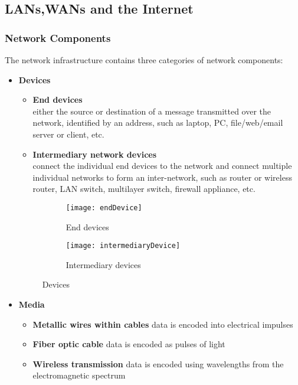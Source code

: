 \documentclass[crop=false]{standalone}
\begin{document}
\subsection{LANs,WANs and the Internet}
\subsubsection{Network Components}
The network infrastructure contains three categories of network components:
\begin{itemize}
  \item \textbf{Devices}
  \begin{itemize}
    \item \textbf{End devices}\\either the source or destination of a message transmitted over the network, identified by an address, such as laptop, PC, file/web/email server or client, etc.
    \item \textbf{Intermediary network devices}\\connect the individual end devices to the network and connect multiple individual networks to form an inter-network, such as router or wireless router, LAN switch, multilayer switch, firewall appliance, etc.
  \end{itemize}
  
  \begin{figure}[ht]
    \centering
    \begin{subfigure}{.5\textwidth}
      \centering
      \texttt{[image: endDevice]}
      \caption{End devices}
      \label{fig:end devices}
      \end{subfigure}%
    \begin{subfigure}{.5\textwidth}
      \centering
      \texttt{[image: intermediaryDevice]}
      \caption{Intermediary devices}
      \label{fig:intermediary devices}
    \end{subfigure}
    \caption{Devices}
    \label{fig:Devices}
  \end{figure}

  \item \textbf{Media}
  \begin{itemize}
    \item \textbf{Metallic wires within cables} \hspace{5mm}data is encoded into electrical impulses
    \item \textbf{Fiber optic cable} \hspace{5mm}data is encoded as pulses of light
    \item \textbf{Wireless transmission} \hspace{5mm}data is encoded using wavelengths from the electromagnetic spectrum
  \end{itemize}
  

\end{itemize}
\end{document}
